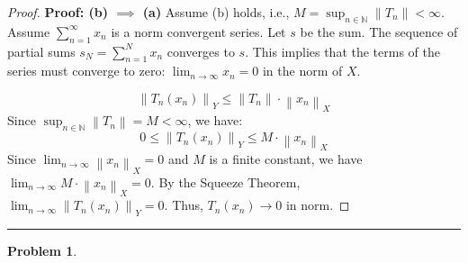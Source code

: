 \documentclass{article}
\newcommand{\norm}[1]{\left\|#1\right\|}
\newcommand{\N}{\mathbb{N}}
\newtheorem{problem}{Problem}
\begin{document}
\begin{proof}
\textbf{Proof: (b) $\implies$ (a)}
Assume (b) holds, i.e., $M = \sup_{n\in\N} \norm{T_n} < \infty$.
Assume $\sum_{n=1}^{\infty}x_{n}$ is a norm convergent series. Let $s$ be the sum. The sequence of partial sums $s_N = \sum_{n=1}^N x_n$ converges to $s$.
This implies that the terms of the series must converge to zero: $\lim_{n\to\infty} x_n = 0$ in the norm of $X$.

$$
\norm{T_n(x_n)}_Y \leq \norm{T_n} \cdot \norm{x_n}_X
$$
Since $\sup_{n\in\N} \norm{T_n} = M < \infty$, we have:
$$
0 \leq \norm{T_n(x_n)}_Y \leq M \cdot \norm{x_n}_X
$$
Since $\lim_{n\to\infty} \norm{x_n}_X = 0$ and $M$ is a finite constant, we have $\lim_{n\to\infty} M \cdot \norm{x_n}_X = 0$.
By the Squeeze Theorem, $\lim_{n\to\infty} \norm{T_n(x_n)}_Y = 0$. Thus, $T_n(x_n) \to 0$ in norm.

\end{proof}


\hrule
\vspace{0.5em}


\begin{problem}
\end{problem}
\end{document}
